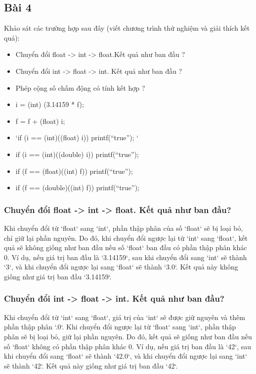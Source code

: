 \subsection{Bài 4}
Khảo sát các trường hợp sau đây (viết chương trình thử nghiệm và giải thích kết quả): 

\begin{itemize}
	\item Chuyển đổi float -> int -> float.Kết quả như ban đầu ?
	\item Chuyển đổi int -> float -> int. Kết quả như ban đầu ?
	\item Phép cộng số chấm động có tính kết hợp ?
	\item i = (int) (3.14159 * f);
	\item f = f + (float) i; 
	\item `if (i == (int)((float) i)) { printf(“true”); }`
	\item if (i == (int)((double) i)) { printf(“true”); }
	\item if (f == (float)((int) f)) { printf(“true”); } 
	\item if (f == (double)((int) f)) { printf(“true”); }
\end{itemize}

\subsubsection{Chuyển đổi float -> int -> float. Kết quả như ban đầu?}

Khi chuyển đổi từ `float` sang `int`, phần thập phân của số `float` sẽ bị loại bỏ, chỉ giữ lại phần nguyên. Do đó, khi chuyển đổi ngược lại từ `int` sang `float`, kết quả sẽ không giống như ban đầu nếu số `float` ban đầu có phần thập phân khác 0. Ví dụ, nếu giá trị ban đầu là `3.14159`, sau khi chuyển đổi sang `int` sẽ thành `3`, và khi chuyển đổi ngược lại sang `float` sẽ thành `3.0`. Kết quả này không giống như giá trị ban đầu `3.14159`.

\subsubsection{Chuyển đổi int -> float -> int. Kết quả như ban đầu?}

Khi chuyển đổi từ `int` sang `float`, giá trị của `int` sẽ được giữ nguyên và thêm phần thập phân `.0`. Khi chuyển đổi ngược lại từ `float` sang `int`, phần thập phân sẽ bị loại bỏ, giữ lại phần nguyên. Do đó, kết quả sẽ giống như ban đầu nếu số `float` không có phần thập phân khác 0. Ví dụ, nếu giá trị ban đầu là `42`, sau khi chuyển đổi sang `float` sẽ thành `42.0`, và khi chuyển đổi ngược lại sang `int` sẽ thành `42`. Kết quả này giống như giá trị ban đầu `42`.


